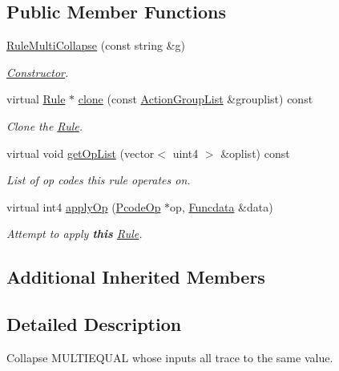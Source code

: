 \subsection*{Public Member Functions}
\begin{DoxyCompactItemize}
\item 
\mbox{\hyperlink{class_rule_multi_collapse_abc8e95c53f2e88e7859650b5b7a75e36}{Rule\+Multi\+Collapse}} (const string \&g)
\begin{DoxyCompactList}\small\item\em \mbox{\hyperlink{class_constructor}{Constructor}}. \end{DoxyCompactList}\item 
virtual \mbox{\hyperlink{class_rule}{Rule}} $\ast$ \mbox{\hyperlink{class_rule_multi_collapse_a6aceb3f6d65434184d65727bdc6da79e}{clone}} (const \mbox{\hyperlink{class_action_group_list}{Action\+Group\+List}} \&grouplist) const
\begin{DoxyCompactList}\small\item\em Clone the \mbox{\hyperlink{class_rule}{Rule}}. \end{DoxyCompactList}\item 
virtual void \mbox{\hyperlink{class_rule_multi_collapse_adb7760b376adb4def48cf5df2645bb6f}{get\+Op\+List}} (vector$<$ uint4 $>$ \&oplist) const
\begin{DoxyCompactList}\small\item\em List of op codes this rule operates on. \end{DoxyCompactList}\item 
virtual int4 \mbox{\hyperlink{class_rule_multi_collapse_a65f32f0c3dfaad6ba711cb1c9dc72954}{apply\+Op}} (\mbox{\hyperlink{class_pcode_op}{Pcode\+Op}} $\ast$op, \mbox{\hyperlink{class_funcdata}{Funcdata}} \&data)
\begin{DoxyCompactList}\small\item\em Attempt to apply {\bfseries{this}} \mbox{\hyperlink{class_rule}{Rule}}. \end{DoxyCompactList}\end{DoxyCompactItemize}
\subsection*{Additional Inherited Members}


\subsection{Detailed Description}
Collapse M\+U\+L\+T\+I\+E\+Q\+U\+AL whose inputs all trace to the same value. 

